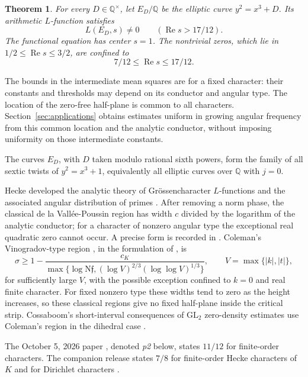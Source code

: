 \documentclass[11pt,a4paper]{article}
\numberwithin{equation}{section}
\newtheorem{maintheorem}{Theorem}
\theoremstyle{definition}
\theoremstyle{remark}
\newcommand{\Q}{\mathbb Q}
\newcommand{\N}{\mathrm N}
\newcommand{\Rea}{\operatorname{Re}}
\begin{document}
\begin{maintheorem}\label{thm:B}
For every $D\in\Q^\times$, let $E_D/\Q$ be the elliptic curve $y^2=x^3+D$. Its arithmetic $L$-function satisfies
\[
 L(E_D,s)\ne0\qquad(\Rea s>17/12).
\]
The functional equation has center $s=1$. The nontrivial zeros, which lie in $1/2\le\Rea s\le3/2$, are confined to
\[
 7/12\le\Rea s\le17/12.
\]
\end{maintheorem}

The bounds in the intermediate mean squares are for a fixed character: their constants and thresholds may depend on its conductor and angular type. The location of the zero-free half-plane is common to all characters. Section~\ref{sec:applications} obtains estimates uniform in growing angular frequency from this common location and the analytic conductor, without imposing uniformity on those intermediate constants.

The curves $E_D$, with $D$ taken modulo rational sixth powers, form the family of all sextic twists of $y^2=x^3+1$, equivalently all elliptic curves over $\Q$ with $j=0$.

Hecke developed the analytic theory of Gr\"ossencharacter $L$-functions and the associated angular distribution of primes \cite{Hecke}. After removing a norm phase, the classical de la Vall\'ee-Poussin region has width $c$ divided by the logarithm of the analytic conductor; for a character of nonzero angular type the exceptional real quadratic zero cannot occur. A precise form is recorded in \cite[Lemma 2.1]{CPS}. Coleman's Vinogradov-type region \cite[Theorem 2]{Coleman}, in the formulation of \cite[Theorem 2.5]{Khale}, is
\begin{equation}\label{eq:classicalregion}
 \sigma\ge1-\frac{c_K}{\max\{\log\N\mathfrak f,(\log V)^{2/3}(\log\log V)^{1/3}\}},
 \qquad V=\max\{|k|,|t|\},
\end{equation}
for sufficiently large $V$, with the possible exception confined to $k=0$ and real finite character. For fixed nonzero type these widths tend to zero as the height increases, so these classical regions give no fixed half-plane inside the critical strip. Cossaboom's short-interval consequences of $\mathrm{GL}_2$ zero-density estimates use Coleman's region in the dihedral case \cite[Corollaries 1.3--1.4 and Section 9]{Cossaboom}.

The October 5, 2026 paper \cite{QRH12}, denoted \emph{p2} below, states $11/12$ for finite-order characters. The companion release states $7/8$ for finite-order Hecke characters of $K$ and for Dirichlet characters \cite[Theorem 1.1]{QRH78}. 
\end{document}
